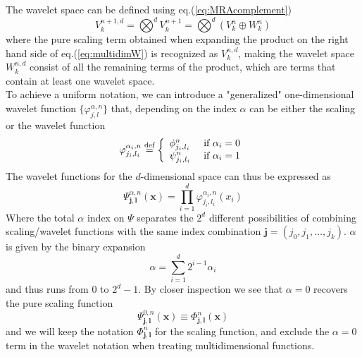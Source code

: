\noindent
The wavelet space can be defined using eq.(\ref{eq:MRAcomplement})
\begin{equation}
	\label{eq:multidimW}
	V^{n+1,d}_k = \bigotimes^d V^{n+1}_k = \bigotimes^d (V^n_k \oplus W^n_k)
\end{equation}
where the pure scaling term obtained when expanding the product on the right
hand side of eq.(\ref{eq:multidimW}) is recognized as $V^{n,d}_k$, making the
wavelet space $W^{n,d}_k$ consist of all the remaining terms of the product, 
which are terms that contain at least one wavelet space.\\

\noindent
To achieve a uniform notation, we can introduce a "generalized" one-dimensional
wavelet function $\lbrace\varphi_{j,l}^{\alpha,n}\rbrace$ that, depending on 
the index $\alpha$ can be either the scaling or the wavelet function
\begin{equation}
	\varphi^{\alpha_i,n}_{j_i,l_i} \stackrel{\text{def}}{\hbox{=}} 
		\left\{
		\begin{array}{lll}
			\phi^n_{j_i,l_i}	&\mbox{ if }\alpha_i = 0\\
			\psi^n_{j_i,l_i}	&\mbox{ if }\alpha_i = 1
		\end{array}
		\right.
\end{equation}
The wavelet functions for the $d$-dimensional space can thus be expressed as
\begin{equation}
	\Psi^{\alpha,n}_{\boldsymbol{j}, \boldsymbol{l}}(\boldsymbol{x}) =
	\prod_{i=1}^d\varphi^{\alpha_i,n}_{j_i,l_i}(x_i)
\end{equation}
Where the total $\alpha$ index on $\Psi$ separates the $2^d$ different
possibilities of combining scaling/wavelet functions with the same index
combination $\boldsymbol{j} = (j_0,j_1,\dots,j_k)$. $\alpha$ is given by the 
binary expansion
\begin{equation}
	\alpha = \sum_{i=1}^d 2^{i-1}\alpha_i
\end{equation}
and thus runs from $0$ to $2^d-1$. By closer inspection we see that $\alpha=0$
recovers the pure scaling function
\begin{equation}
	\Psi^{0,n}_{\boldsymbol{j},\boldsymbol{l}}(\boldsymbol{x}) \equiv
	\Phi^n_{\boldsymbol{j},\boldsymbol{l}}(\boldsymbol{x})
\end{equation}
and we will keep the notation $\Phi^n_{\boldsymbol{j},\boldsymbol{l}}$ for the
scaling function, and exclude the $\alpha=0$ term in the wavelet notation
when treating multidimensional functions.\\

